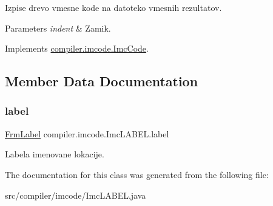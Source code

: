Izpise drevo vmesne kode na datoteko vmesnih rezultatov.


\begin{DoxyParams}{Parameters}
{\em indent} & Zamik. \\
\hline
\end{DoxyParams}


Implements \hyperlink{interfacecompiler_1_1imcode_1_1_imc_code_a26451dea2ab4dbd7054ac33f4c6d71fe}{compiler.\+imcode.\+Imc\+Code}.



\subsection{Member Data Documentation}
\mbox{\label{classcompiler_1_1imcode_1_1_imc_l_a_b_e_l_ad06f77e89213d5abfd48ffc9b800a7b5}} 
\subsubsection{\texorpdfstring{label}{label}}
{\footnotesize\ttfamily \hyperlink{classcompiler_1_1frames_1_1_frm_label}{Frm\+Label} compiler.\+imcode.\+Imc\+L\+A\+B\+E\+L.\+label}

Labela imenovane lokacije. 

The documentation for this class was generated from the following file\+:\begin{DoxyCompactItemize}
\item 
src/compiler/imcode/Imc\+L\+A\+B\+E\+L.\+java\end{DoxyCompactItemize}
